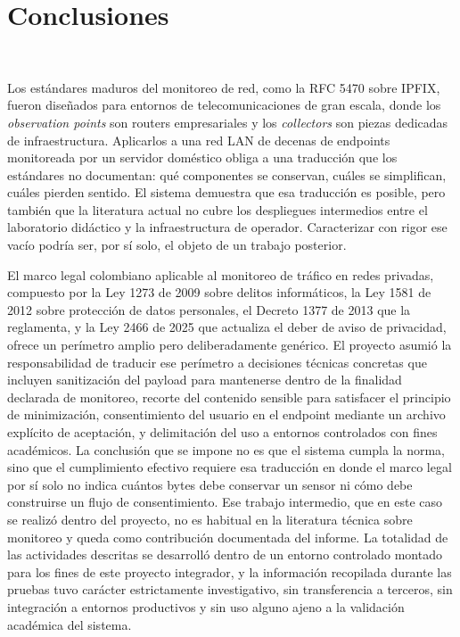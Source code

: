 \section{Conclusiones}
~\label{sec:conclusiones}

Los estándares maduros del monitoreo de red, como la RFC 5470 sobre IPFIX, 
fueron diseñados para entornos de telecomunicaciones de gran escala, donde 
los \textit{observation points} son routers empresariales y los 
\textit{collectors} son piezas dedicadas de infraestructura. Aplicarlos a 
una red LAN de decenas de endpoints monitoreada por un servidor doméstico 
obliga a una traducción que los estándares no documentan: qué componentes 
se conservan, cuáles se simplifican, cuáles pierden sentido. El sistema 
demuestra que esa traducción es posible, pero también que la literatura 
actual no cubre los despliegues intermedios entre el laboratorio didáctico 
y la infraestructura de operador. Caracterizar con rigor ese vacío podría 
ser, por sí solo, el objeto de un trabajo posterior.

El marco legal colombiano aplicable al monitoreo de tráfico en redes 
privadas, compuesto por la Ley 1273 de 2009 sobre delitos informáticos, 
la Ley 1581 de 2012 sobre protección de datos personales, el Decreto 1377 
de 2013 que la reglamenta, y la Ley 2466 de 2025 que actualiza el deber 
de aviso de privacidad, ofrece un perímetro amplio pero deliberadamente 
genérico. El proyecto asumió la responsabilidad de traducir ese perímetro 
a decisiones técnicas concretas que incluyen sanitización del payload 
para mantenerse dentro de la finalidad declarada de monitoreo, recorte 
del contenido sensible para satisfacer el principio de minimización, 
consentimiento del usuario en el endpoint mediante un archivo explícito 
de aceptación, y delimitación del uso a entornos controlados con fines 
académicos. La conclusión que se impone no es que el sistema cumpla la 
norma, sino que el cumplimiento efectivo requiere esa traducción en donde 
el marco legal por sí solo no indica cuántos bytes debe conservar un 
sensor ni cómo debe construirse un flujo de consentimiento. Ese trabajo 
intermedio, que en este caso se realizó dentro del proyecto, no es 
habitual en la literatura técnica sobre monitoreo y queda como 
contribución documentada del informe. La totalidad de las actividades 
descritas se desarrolló dentro de un entorno controlado montado para los 
fines de este proyecto integrador, y la información recopilada durante 
las pruebas tuvo carácter estrictamente investigativo, sin transferencia 
a terceros, sin integración a entornos productivos y sin uso alguno ajeno 
a la validación académica del sistema.

